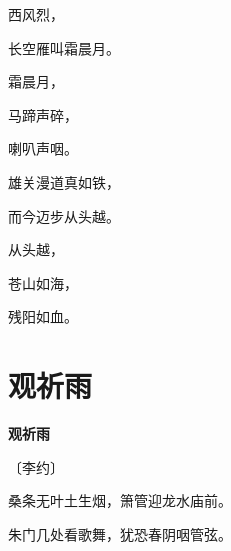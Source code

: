 \documentclass[12pt,UTF-8,openany,fontset=none]{ctexbook}
\begin{document}
    \vspace{18pt}  %

\begin{center}
    \begin{Large}

        西风烈，

        长空雁叫霜晨月。

        霜晨月，

        马蹄声碎，

        喇叭声咽。

        \vspace{18pt}  %

        雄关漫道真如铁，

        而今迈步从头越。

        从头越，

        苍山如海，

        残阳如血。

    \end{Large}

\end{center}

\vspace{8pt}
\clearpage

\section{观祈雨}


\begin{center}
    {\bfseries 观祈雨}

    \vspace{18pt}

    \begin{large}\xuwen
        〔李约〕
    \end{large}

\end{center}

    \vspace{18pt}  %

\begin{center}
    \begin{Large}

        桑条无叶土生烟，箫管迎龙水庙前。

        朱门几处看歌舞，犹恐春阴咽管弦。

    \end{Large}

\end{center}
\end{document}
